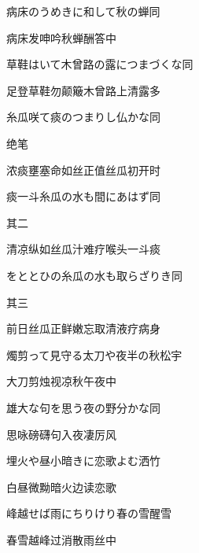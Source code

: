 \begin{haiku}
    {\FH 病床のうめきに和して秋の蝉}\hfill{\FH 同}

    {\FK 病床发呻吟秋蝉酬答中}
\end{haiku}

\begin{haiku}
    {\FH 草鞋はいて木曾路の露につまづくな}\hfill{\FH 同}

    {\FK 足登草鞋勿颠簸木曾路上清露多}
\end{haiku}

\begin{haiku}
    {\FH 糸瓜咲て痰のつまりし仏かな}\hfill{\FH 同}

    {\FK 绝笔}

    {\FK 浓痰壅塞命如丝正值丝瓜初开时}
\end{haiku}

\begin{haiku}
    {\FH 痰一斗糸瓜の水も間にあはず}\hfill{\FH 同}

    {\FK 其二}

    {\FK 清凉纵如丝瓜汁难疗喉头一斗痰}
\end{haiku}

\begin{haiku}
    {\FH をととひの糸瓜の水も取らざりき}\hfill{\FH 同}

    {\FK 其三}

    {\FK 前日丝瓜正鲜嫩忘取清液疗病身}
\end{haiku}

\begin{haiku}
    {\FH 燭剪って見守る太刀や夜半の秋}\hfill{\FH 松宇}

    {\FK 大刀剪烛视凉秋午夜中}
\end{haiku}

\begin{haiku}
    {\FH 雄大な句を思う夜の野分かな}\hfill{\FH 同}

    {\FK 思咏磅礴句入夜凄厉风}
\end{haiku}

\begin{haiku}
    {\FH 埋火や昼小暗きに恋歌よむ}\hfill{\FH 洒竹}

    {\FK 白昼微黝暗火边读恋歌}
\end{haiku}

\begin{haiku}
    {\FH 峰越せば雨にちりけり春の雪}\hfill{\FH 醒雪}

    {\FK 春雪越峰过消散雨丝中}
\end{haiku}

